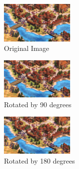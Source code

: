 \documentclass{article}
\begin{document}
	\listoffigures
	\pagebreak
	
	\begin{figure}[h]
		\centering
		\includegraphics[width=1.4in]{aage.jpg}
		\caption{Original Image}
	\end{figure}
	
	\begin{figure}[h]
		\centering
		\includegraphics[width=1.4in, angle=90]{aage.jpg}
		\caption{Rotated by 90 degrees}
	\end{figure}
	
	\begin{figure}[h]
		\centering
		\includegraphics[width=1.4in, angle=180]{aage.jpg}
		\caption{Rotated by 180 degrees}
	\end{figure}
	
	\pagebreak
	
\end{document}
